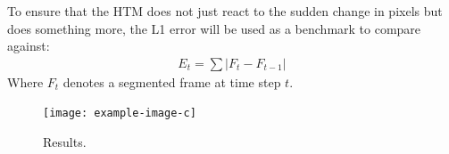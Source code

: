 To ensure that the HTM does not just react to the sudden change in pixels but does something more, the L1 error will be used as a benchmark to compare against:
\begin{align*}
    E_t=\sum|F_t-F_{t-1}|
\end{align*}
Where $F_t$ denotes a segmented frame at time step $t$.
\begin{figure}[H]
    \centering
    \texttt{[image: example-image-c]}
    \caption{Results.}
\end{figure}
